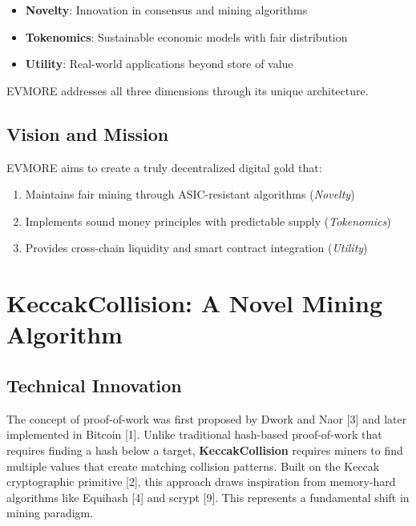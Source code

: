 \documentclass[11pt,a4paper]{article}
\begin{document}
\begin{itemize}
    \item \textbf{Novelty}: Innovation in consensus and mining algorithms
    \item \textbf{Tokenomics}: Sustainable economic models with fair distribution
    \item \textbf{Utility}: Real-world applications beyond store of value
\end{itemize}

EVMORE addresses all three dimensions through its unique architecture.

\subsection{Vision and Mission}

EVMORE aims to create a truly decentralized digital gold that:

\begin{enumerate}
    \item Maintains fair mining through ASIC-resistant algorithms (\textit{Novelty})
    \item Implements sound money principles with predictable supply (\textit{Tokenomics})
    \item Provides cross-chain liquidity and smart contract integration (\textit{Utility})
\end{enumerate}

\section{KeccakCollision: A Novel Mining Algorithm}

\subsection{Technical Innovation}

The concept of proof-of-work was first proposed by Dwork and Naor [3] and later implemented in Bitcoin [1]. Unlike traditional hash-based proof-of-work that requires finding a hash below a target, \textbf{KeccakCollision} requires miners to find multiple values that create matching collision patterns. Built on the Keccak cryptographic primitive [2], this approach draws inspiration from memory-hard algorithms like Equihash [4] and scrypt [9]. This represents a fundamental shift in mining paradigm.
\end{document}
